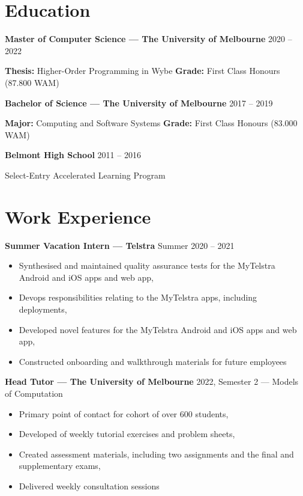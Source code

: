 \documentclass[9pt]{extarticle}
\newcommand{\entry}[3]{
    \textbf{#1} \newline
    {\footnotesize #2}
    \vspace{.05em}
    \begin{flushleft}
        #3
    \end{flushleft}
}
\begin{document}
\begin{minipage}[t]{.65\textwidth}
\vspace*{0pt}

\section{Education}

\entry{Master of Computer Science --- The University of Melbourne}
{2020 -- 2022}
{
    \textbf{Thesis:} Higher-Order Programming in Wybe \newline
    \textbf{Grade:} First Class Honours (87.800 WAM) \newline
}

\entry{Bachelor of Science --- The University of Melbourne}
{2017 -- 2019}
{
    \textbf{Major:} Computing and Software Systems \newline
    \textbf{Grade:} First Class Honours (83.000 WAM) \newline
}

\entry{Belmont High School}
{2011 -- 2016}
{Select-Entry Accelerated Learning Program}

\medskip

\section{Work Experience}

\entry{Summer Vacation Intern --- Telstra}
{Summer 2020 -- 2021}
{
    \begin{itemize}
        \item Synthesised and maintained quality assurance tests for the MyTelstra Android and iOS apps and web app,
        \item Devops responsibilities relating to the MyTelstra apps, including deployments,
        \item Developed novel features for the MyTelstra Android and iOS apps and web app,
        \item Constructed onboarding and walkthrough materials for future employees
    \end{itemize}
}
\vspace{1.5em}

\entry{Head Tutor --- The University of Melbourne}
{
    2022, Semester 2 --- Models of Computation
}
{
    \begin{itemize}
        \item Primary point of contact for cohort of over 600 students,
        \item Developed of weekly tutorial exercises and problem sheets,
        \item Created assessment materials, including two assignments and the final and supplementary exams,
        \item Delivered weekly consultation sessions
    \end{itemize}
}
\vspace{1.5em}


\end{minipage}
\end{document}
